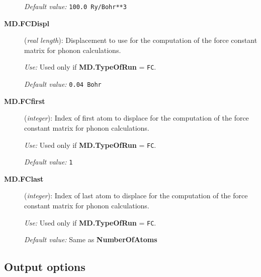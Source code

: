 \begin{description}
{\it Default value:}  {\tt 100.0 Ry/Bohr**3}
        
\item[{\bf MD.FCDispl}] ({\it real length}): 
Displacement to use for the computation of the force constant
matrix for phonon calculations.

{\it Use:} Used only if {\bf MD.TypeOfRun} = {\tt FC}.

{\it Default value:}  {\tt 0.04 Bohr}

\item[{\bf MD.FCfirst}] ({\it integer}): 
Index of first atom to displace for the computation of the force constant
matrix for phonon calculations.

{\it Use:} Used only if {\bf MD.TypeOfRun} = {\tt FC}.

{\it Default value:}  {\tt 1}

\item[{\bf MD.FClast}] ({\it integer}): 
Index of last atom to displace for the computation of the force constant
matrix for phonon calculations.

{\it Use:} Used only if {\bf MD.TypeOfRun} = {\tt FC}.

{\it Default value:}  Same as {\bf NumberOfAtoms}

\end{description}



\vspace{5pt}
\subsection{Output options}

